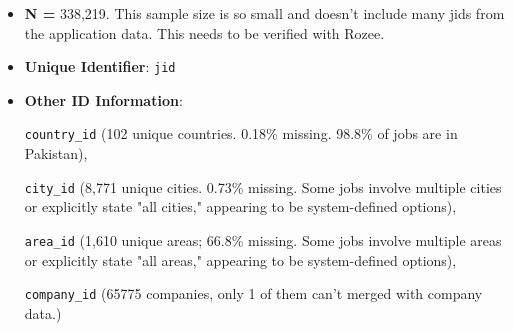\documentclass[12pt]{article}
\begin{document}
\begin{itemize}
    \item \textbf{N = }338,219. This sample size is so small and doesn't include many jids from the application data. This needs to be verified with Rozee.
    \item \textbf{Unique Identifier}: \texttt{jid}
    \item \textbf{Other ID Information}: 

    
    \texttt{country\_id} (102 unique countries. 0.18\% missing. 98.8\% of jobs are in Pakistan), 
    
    \texttt{city\_id} (8,771 unique cities. 0.73\% missing. Some jobs involve multiple cities or explicitly state "all cities," appearing to be system-defined options), 
    
    
    \texttt{area\_id} (1,610 unique areas; 66.8\% missing. Some jobs involve multiple areas or explicitly state "all areas," appearing to be system-defined options), 
    
    
    \texttt{company\_id} (65775 companies, only 1 of them can't merged with company data.)

    \end{itemize}
\end{document}
